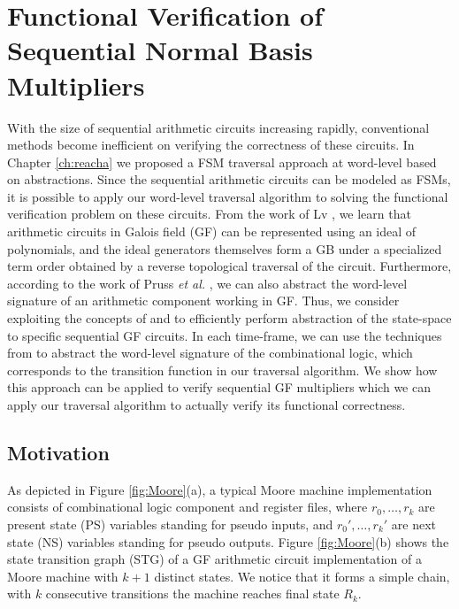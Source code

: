 \chapter{Functional Verification of Sequential Normal Basis Multipliers}
\label{ch:normal}
With the size of sequential arithmetic circuits increasing rapidly, 
conventional methods become inefficient on verifying the correctness of these circuits.
In Chapter \ref{ch:reacha} we proposed a FSM traversal approach at word-level 
based on abstractions. Since the sequential arithmetic circuits can be modeled 
as FSMs, it is possible to apply our word-level traversal algorithm to solving 
the functional verification problem on these circuits.
From the work of Lv \cite{lv:phd},
we learn that arithmetic circuits in Galois field (GF) can be
represented using an ideal of polynomials, and the 
ideal generators themselves form a GB under a specialized term order
obtained by a reverse topological traversal of the circuit.
Furthermore, according to the work of Pruss {\it et al.}
\cite{pruss:tcad15}, we can also abstract the word-level signature of an arithmetic 
component working in GF. Thus, we consider exploiting the concepts of \cite{lv:phd} and \cite{pruss:tcad15}
to efficiently perform abstraction of the state-space to specific sequential GF circuits.
In each time-frame, we can use the techniques 
from \cite{pruss:tcad15} to abstract the word-level
signature of the combinational logic, which corresponds
to the transition function in our traversal algorithm.
We show how this approach can be applied to verify sequential GF multipliers
which we can apply our traversal algorithm to actually 
verify its functional correctness.

\section{Motivation}
\label{sec:normal_motiv}
As depicted in Figure \ref{fig:Moore}(a), a typical Moore machine implementation
consists of combinational logic component and register files, where
$r_0,\dots,r_k$ are present state (PS) variables 
standing for pseudo inputs, and $r_0',\dots,r_k'$ are next state (NS) variables standing for
pseudo outputs. Figure \ref{fig:Moore}(b) shows the state transition graph (STG) of a
GF arithmetic circuit implementation of 
a Moore machine with $k+1$ distinct states. We notice that it forms a simple chain,
with $k$ consecutive transitions the machine reaches final state $R_k$.

